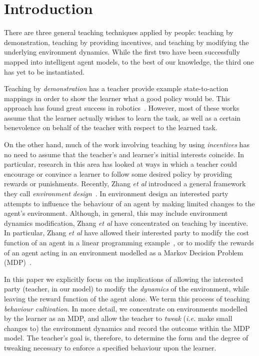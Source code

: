 

\section{Introduction}

There are three general teaching techniques applied by people:
teaching by demonstration, teaching by providing incentives, and
teaching by modifying the underlying environment dynamics.  While the
first two have been successfully mapped into intelligent agent models,
to the best of our knowledge, the third one has yet to be
instantiated.

Teaching by {\em demonstration} has a teacher provide example
state-to-action mappings in order to show the learner what a good
policy would be.  This approach has found great success in
robotics~\cite{argal_etal_2009}. However, most of these works assume
that the learner actually wishes to learn the task, as well as a
certain benevolence on behalf of the teacher with respect to the
learned task.

On the other hand, much of the work involving teaching by using {\em
  incentives} has no need to assume that the teacher's and learner's
initial interests coincide.  In particular, research in this area has
looked at ways in which a teacher could encourage or convince a
learner to follow some desired policy by providing rewards or
punishments.  Recently, Zhang \emph{et al} introduced a general
framework they call \emph{environment
  design}~\cite{Zhang09:General}. In environment design an interested
party attempts to influence the behaviour of an agent by making
limited changes to the agent's environment. Although, in general, this
may include environment dynamics modification, Zhang \emph{et al} have
concentrated on teaching by incentive. In particular, Zhang \emph{et
  al} have allowed their interested party to modify the cost function
of an agent in a linear programming example~\cite{Zhang09:General}, or
to modify the rewards of an agent acting in an environment modelled as
a Markov Decision Problem
(MDP)~\cite{zhang_parkes_2008,Zhang09:Policy}.

In this paper we explicitly focus on the implications of allowing the
interested party (teacher, in our model) to modify the \emph{dynamics}
of the environment, while leaving the reward function of the agent
alone. We term this process of teaching {\em behaviour
  cultivation}. In more detail, we concentrate on environments
modelled by the learner as an MDP, and allow the teacher to
\emph{tweak} (\emph{i.e.} make small changes to) the environment
dynamics and record the outcome within the MDP model.  The teacher's
goal is, therefore, to determine the form and the degree of tweaking
necessary to enforce a specified behaviour upon the learner.


